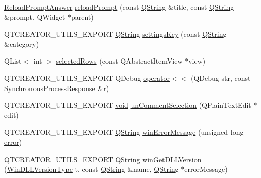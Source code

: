 \begin{DoxyCompactItemize}
\hyperlink{namespace_utils_a4b02d8e41b34d9ba5605aa6235965efb}{\-Reload\-Prompt\-Answer} \hyperlink{namespace_utils_ac0810749b06ed4d230efcf4a24666667}{reload\-Prompt} (const \hyperlink{group___u_a_v_objects_plugin_gab9d252f49c333c94a72f97ce3105a32d}{\-Q\-String} \&title, const \hyperlink{group___u_a_v_objects_plugin_gab9d252f49c333c94a72f97ce3105a32d}{\-Q\-String} \&prompt, \-Q\-Widget $\ast$parent)
\item 
\-Q\-T\-C\-R\-E\-A\-T\-O\-R\-\_\-\-U\-T\-I\-L\-S\-\_\-\-E\-X\-P\-O\-R\-T \hyperlink{group___u_a_v_objects_plugin_gab9d252f49c333c94a72f97ce3105a32d}{\-Q\-String} \hyperlink{namespace_utils_a9d565bb385c00080db591e6bcd80f934}{settings\-Key} (const \hyperlink{group___u_a_v_objects_plugin_gab9d252f49c333c94a72f97ce3105a32d}{\-Q\-String} \&category)
\item 
\-Q\-List$<$ int $>$ \hyperlink{namespace_utils_a83145cfcb4c857f7b60f65d03e9e2b61}{selected\-Rows} (const \-Q\-Abstract\-Item\-View $\ast$view)
\item 
\-Q\-T\-C\-R\-E\-A\-T\-O\-R\-\_\-\-U\-T\-I\-L\-S\-\_\-\-E\-X\-P\-O\-R\-T \-Q\-Debug \hyperlink{namespace_utils_a23baba2ec67c78730212cc29b90bf43a}{operator$<$$<$} (\-Q\-Debug str, const \hyperlink{struct_utils_1_1_synchronous_process_response}{\-Synchronous\-Process\-Response} \&r)
\item 
\-Q\-T\-C\-R\-E\-A\-T\-O\-R\-\_\-\-U\-T\-I\-L\-S\-\_\-\-E\-X\-P\-O\-R\-T \hyperlink{group___u_a_v_objects_plugin_ga444cf2ff3f0ecbe028adce838d373f5c}{void} \hyperlink{namespace_utils_a50f750da3c42852f02983eed80847919}{un\-Comment\-Selection} (\-Q\-Plain\-Text\-Edit $\ast$edit)
\item 
\-Q\-T\-C\-R\-E\-A\-T\-O\-R\-\_\-\-U\-T\-I\-L\-S\-\_\-\-E\-X\-P\-O\-R\-T \hyperlink{group___u_a_v_objects_plugin_gab9d252f49c333c94a72f97ce3105a32d}{\-Q\-String} \hyperlink{namespace_utils_a88cd1d3b7b4907b09a4fa1baf2794a4b}{win\-Error\-Message} (unsigned long \hyperlink{uavobjecttemplate_8m_ae37d8f40ba76a59d04a674d824e8721f}{error})
\item 
\-Q\-T\-C\-R\-E\-A\-T\-O\-R\-\_\-\-U\-T\-I\-L\-S\-\_\-\-E\-X\-P\-O\-R\-T \hyperlink{group___u_a_v_objects_plugin_gab9d252f49c333c94a72f97ce3105a32d}{\-Q\-String} \hyperlink{namespace_utils_a95863cc1ee8f125ee968be3e44da744e}{win\-Get\-D\-L\-L\-Version} (\hyperlink{namespace_utils_a8a09ecaa3bd4054c9ec43e90ec1a355e}{\-Win\-D\-L\-L\-Version\-Type} t, const \hyperlink{group___u_a_v_objects_plugin_gab9d252f49c333c94a72f97ce3105a32d}{\-Q\-String} \&name, \hyperlink{group___u_a_v_objects_plugin_gab9d252f49c333c94a72f97ce3105a32d}{\-Q\-String} $\ast$error\-Message)
\end{DoxyCompactItemize}


